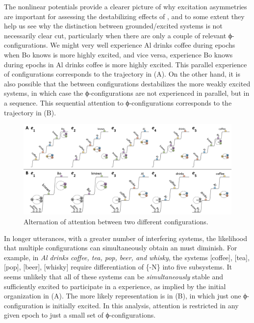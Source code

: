   The nonlinear potentials provide a clearer picture of why excitation asymmetries are important for assessing the destabilizing effects of , and to some extent they help us see why the distinction between grounded/excited systems is not necessarily clear cut, particularly when there are only a couple of relevant ϕ-con\-fig\-u\-ra\-tions. We might very well experience {\textbar}Al drinks coffee{\textbar} during epochs when {\textbar}Bo knows{\textbar} is more highly excited, and vice versa, experience {\textbar}Bo knows{\textbar} during epochs in {\textbar}Al drinks coffee{\textbar} is more highly excited. This parallel experience of configurations corresponds to the trajectory in {}(A). On the other hand, it is also possible that the  between configurations destabilizes the more weakly excited systems, in which case the ϕ-con\-fig\-u\-ra\-tions are not experienced in parallel, but in a sequence. This sequential attention to ϕ-con\-fig\-u\-ra\-tions corresponds to the trajectory in {}(B).

  
\begin{figure}
\includegraphics[width=\textwidth]{figures/Tilsen-img97.png}
\caption{Alternation of attention between two different configurations.}
\label{fig:4:47}
\end{figure}
 

  In longer utterances, with a greater number of interfering systems, the likelihood that multiple configurations can simultaneously obtain an  must diminish. For example, in \textit{Al drinks coffee, tea, pop, beer, and whisky}, the systems [coffee], [tea], [pop], [beer], [whisky] require differentiation of \{-N\} into five subsystems. It seems unlikely that all of these systems can be \textit{simultaneously} stable and sufficiently excited to participate in a  experience, as implied by the initial organization in {}(A). The more likely representation is in (B), in which just one ϕ-con\-fig\-u\-ra\-tion is initially excited. In this analysis, attention is restricted in any given epoch to just a small set of ϕ-con\-fig\-u\-ra\-tions.

